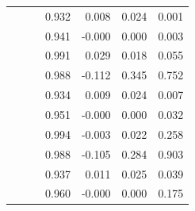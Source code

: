 \documentclass{svjour3}\usepackage[]{graphicx}\usepackage[]{color}
\begin{document}
\begin{table}[ht]
\begin{tabular}{lllrrrr}
   &  &  & 0.932 & 0.008 & 0.024 & 0.001 \\ 
   &  &  & 0.941 & -0.000 & 0.000 & 0.003 \\ 
   \hline
   &  &  & 0.991 & 0.029 & 0.018 & 0.055 \\ 
   &  &  & 0.988 & -0.112 & 0.345 & 0.752 \\ 
   &  &  & 0.934 & 0.009 & 0.024 & 0.007 \\ 
   &  &  & 0.951 & -0.000 & 0.000 & 0.032 \\ 
   \hline
   &  &  & 0.994 & -0.003 & 0.022 & 0.258 \\ 
   &  &  & 0.988 & -0.105 & 0.284 & 0.903 \\ 
   &  &  & 0.937 & 0.011 & 0.025 & 0.039 \\ 
   &  &  & 0.960 & -0.000 & 0.000 & 0.175 \\ 
   \hline
\end{tabular}
\end{table}
\end{document}
